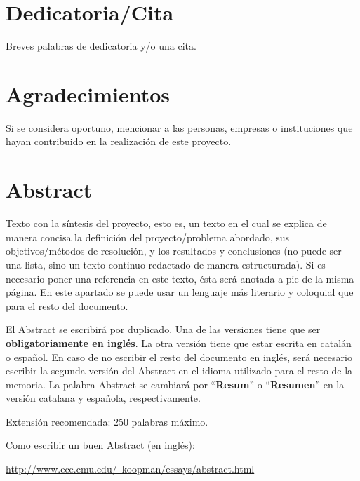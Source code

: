 \chapter*{Dedicatoria/Cita}

Breves palabras de dedicatoria y/o una cita.

\chapter*{Agradecimientos}

Si se considera oportuno, mencionar a las personas, empresas o instituciones que hayan contribuido en la realización de este proyecto.

\chapter*{Abstract}

\onehalfspacing

Texto con la síntesis del proyecto, esto es, un texto en el cual se explica de manera concisa la definición del proyecto/problema abordado, sus objetivos/métodos de resolución, y los resultados y conclusiones (no puede ser una lista, sino un texto continuo redactado de manera estructurada). Si es necesario poner una referencia en este texto, ésta será anotada a pie de la misma página. En este apartado se puede usar un lenguaje más literario y coloquial que para el resto del documento.

El Abstract se escribirá por duplicado. Una de las versiones tiene que ser \textbf{obligatoriamente en inglés}. La otra versión tiene que estar escrita en catalán o español. En caso de no escribir el resto del documento en inglés, será necesario escribir la segunda versión del Abstract en el idioma utilizado para el resto de la memoria. La palabra Abstract se cambiará por ``\textbf{Resum}'' o ``\textbf{Resumen}'' en la versión catalana y española, respectivamente. 

Extensión recomendada: 250 palabras máximo.

Como escribir un buen Abstract (en inglés):

\href{http://www.ece.cmu.edu/~koopman/essays/abstract.html}{http://www.ece.cmu.edu/~koopman/essays/abstract.html}

